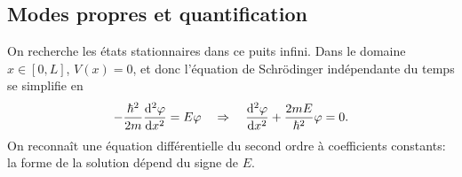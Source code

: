 \documentclass[12pt,fancy]{cours}
\begin{document}
\subsection{Modes propres et quantification}

On recherche les états stationnaires dans ce puits infini. Dans le domaine $x \in [0,L]$, $V(x)=0$, et donc l'équation de Schrödinger indépendante du temps se simplifie en
\begin{equation}
-\frac{\hbar^2}{2m}\frac{\mathrm{d}^2\varphi}{\mathrm{d} x^2}=E\varphi
\quad\Rightarrow\quad\frac{\mathrm{d}^{{2}}{\varphi}}{\mathrm{d}{x}^{{2}}}+\frac{2mE}{\hbar^2}\varphi=0.
\label{eqn:schro_puits_infini}
\end{equation}
On reconnaît une équation différentielle du second ordre à coefficients constants: la forme de la solution dépend du signe de $E$.
\end{document}
